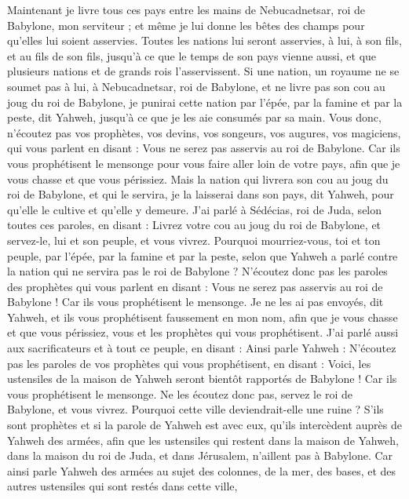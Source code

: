 \begin{multicols}{2}
Maintenant je livre tous ces pays entre les mains de Nebucadnetsar, roi de Babylone, mon serviteur ; et même je lui donne les bêtes des champs pour qu'elles lui soient asservies.
Toutes les nations lui seront asservies, à lui, à son fils, et au fils de son fils, jusqu'à ce que le temps de son pays vienne aussi, et que plusieurs nations et de grands rois l'asservissent.
Si une nation, un royaume ne se soumet pas à lui, à Nebucadnetsar, roi de Babylone, et ne livre pas son cou au joug du roi de Babylone, je punirai cette nation par l'épée, par la famine et par la peste, dit Yahweh, jusqu'à ce que je les aie consumés par sa main.
Vous donc, n'écoutez pas vos prophètes, vos devins, vos songeurs, vos augures, vos magiciens, qui vous parlent en disant : Vous ne serez pas asservis au roi de Babylone.
Car ils vous prophétisent le mensonge pour vous faire aller loin de votre pays, afin que je vous chasse et que vous périssiez.
Mais la nation qui livrera son cou au joug du roi de Babylone, et qui le servira, je la laisserai dans son pays, dit Yahweh, pour qu'elle le cultive et qu'elle y demeure.
J'ai parlé à Sédécias, roi de Juda, selon toutes ces paroles, en disant : Livrez votre cou au joug du roi de Babylone, et servez-le, lui et son peuple, et vous vivrez.
Pourquoi mourriez-vous, toi et ton peuple, par l'épée, par la famine et par la peste, selon que Yahweh a parlé contre la nation qui ne servira pas le roi de Babylone ?
N'écoutez donc pas les paroles des prophètes qui vous parlent en disant : Vous ne serez pas asservis au roi de Babylone ! Car ils vous prophétisent le mensonge.
Je ne les ai pas envoyés, dit Yahweh, et ils vous prophétisent faussement en mon nom, afin que je vous chasse et que vous périssiez, vous et les prophètes qui vous prophétisent.
J'ai parlé aussi aux sacrificateurs et à tout ce peuple, en disant : Ainsi parle Yahweh : N'écoutez pas les paroles de vos prophètes qui vous prophétisent, en disant : Voici, les ustensiles de la maison de Yahweh seront bientôt rapportés de Babylone ! Car ils vous prophétisent le mensonge.
Ne les écoutez donc pas, servez le roi de Babylone, et vous vivrez. Pourquoi cette ville deviendrait-elle une ruine ?
S'ils sont prophètes et si la parole de Yahweh est avec eux, qu'ils intercèdent auprès de Yahweh des armées, afin que les ustensiles qui restent dans la maison de Yahweh, dans la maison du roi de Juda, et dans Jérusalem, n'aillent pas à Babylone.
Car ainsi parle Yahweh des armées au sujet des colonnes, de la mer, des bases, et des autres ustensiles qui sont restés dans cette ville,

\end{multicols}
